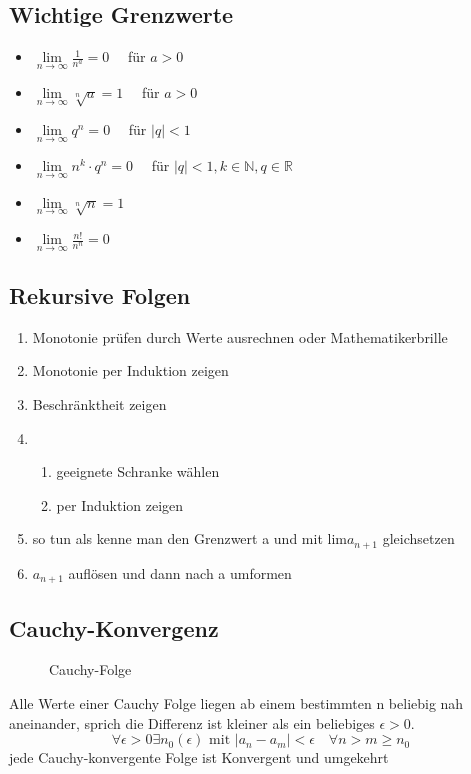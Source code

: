 \documentclass[12pt,a4paper]{article}
\begin{document}
\subsection{Wichtige Grenzwerte}
\begin{itemize}
	\item $\lim\limits_{n\rightarrow \infty} \frac{1}{n^a}=0\quad$ für $a>0$
	\item $\lim\limits_{n\rightarrow \infty} \sqrt[n]{a}=1\quad$ für $a>0$
	\item $\lim\limits_{n\rightarrow \infty} q^n=0\quad$ für $|q|<1$
	\item $\lim\limits_{n\rightarrow \infty} n^k\cdot q^n=0\quad$ für $|q|<1, k\in\mathbb{N}, q\in\mathbb{R}$
	\item $\lim\limits_{n\rightarrow \infty} \sqrt[n]{n}=1$
	\item $\lim\limits_{n\rightarrow \infty} \frac{n!}{n^n}=0$
\end{itemize}


\subsection{Rekursive Folgen}
\begin{enumerate}
	\item Monotonie prüfen durch Werte ausrechnen oder Mathematikerbrille
	\item Monotonie per Induktion zeigen
	\item Beschränktheit zeigen 
	\item \begin{enumerate}
		\item geeignete Schranke wählen
		\item per Induktion zeigen
	\end{enumerate}
	\item so tun als kenne man den Grenzwert a und mit lim$a_{n+1}$ gleichsetzen
	\item $a_{n+1}$ auflösen und dann nach a umformen
\end{enumerate}


\subsection{Cauchy-Konvergenz}
\begin{figure}[htbp]
	\centering
	
	\caption{Cauchy-Folge}
\end{figure}
Alle Werte einer Cauchy Folge liegen ab einem bestimmten n beliebig nah aneinander, sprich die Differenz ist kleiner als ein beliebiges $\epsilon>0$.\\
\[\forall \epsilon > 0 \exists n_0(\epsilon) \text{ mit } |a_n-a_m|<\epsilon\quad\forall n> m\geq n_0\]
jede Cauchy-konvergente Folge ist Konvergent und umgekehrt
\pagebreak
\end{document}
